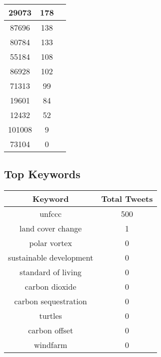 \documentclass{article}\usepackage[T1]{fontenc}
\begin{document}
\begin{tabular}{|c|c|c|}
 \hline
29073 & 178\\ 
 \hline
87696 & 138\\ 
 \hline
80784 & 133\\ 
 \hline
55184 & 108\\ 
 \hline
86928 & 102\\ 
 \hline
71313 & 99\\ 
 \hline
19601 & 84\\ 
 \hline
12432 & 52\\ 
 \hline
101008 & 9\\ 
 \hline
73104 & 0\\ 
 \hline
\end{tabular}\subsection*{Top Keywords}\begin{tabular}{|c|c|}         \hline         Keyword & Total Tweets \\ 
 \hline
unfccc & 500\\ 
 \hline
land cover change & 1\\ 
 \hline
polar vortex & 0\\ 
 \hline
sustainable development & 0\\ 
 \hline
standard of living & 0\\ 
 \hline
carbon dioxide & 0\\ 
 \hline
carbon sequestration & 0\\ 
 \hline
turtles & 0\\ 
 \hline
carbon offset & 0\\ 
 \hline
windfarm & 0\\ 
 \hline
\end{tabular}
\end{document}
